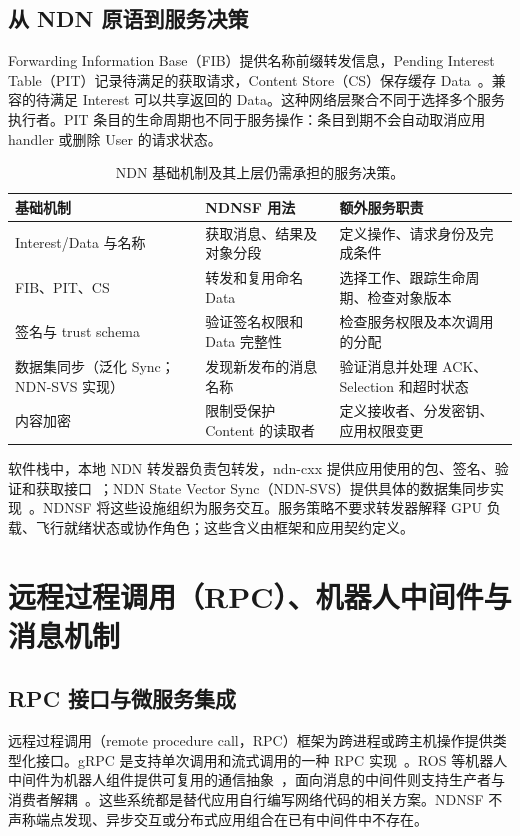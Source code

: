 \subsection{从 NDN 原语到服务决策}
Forwarding Information Base（FIB）提供名称前缀转发信息，Pending Interest Table（PIT）记录待满足的获取请求，Content Store（CS）保存缓存 Data~\cite{yi2013case}。兼容的待满足 Interest 可以共享返回的 Data。这种网络层聚合不同于选择多个服务执行者。PIT 条目的生命周期也不同于服务操作：条目到期不会自动取消应用 handler 或删除 User 的请求状态。

\begin{table}[htbp]\centering\small
\caption{NDN 基础机制及其上层仍需承担的服务决策。}
\label{tab:ndn-runtime-map}
\begin{tabularx}{\textwidth}{p{}XX}
\toprule 基础机制 & NDNSF 用法 & 额外服务职责\\\midrule
Interest/Data 与名称 & 获取消息、结果及对象分段 & 定义操作、请求身份及完成条件\\\midrule
FIB、PIT、CS & 转发和复用命名 Data & 选择工作、跟踪生命周期、检查对象版本\\\midrule
签名与 trust schema & 验证签名权限和 Data 完整性 & 检查服务权限及本次调用的分配\\\midrule
数据集同步（泛化 Sync；NDN-SVS 实现） & 发现新发布的消息名称 & 验证消息并处理 ACK、Selection 和超时状态\\\midrule
内容加密 & 限制受保护 Content 的读取者 & 定义接收者、分发密钥、应用权限变更\\\bottomrule
\end{tabularx}
\end{table}

软件栈中，本地 NDN 转发器负责包转发，ndn-cxx 提供应用使用的包、签名、验证和获取接口~\cite{ndn-cxx}；NDN State Vector Sync（NDN-SVS）提供具体的数据集同步实现~\cite{ndnsvs-github}。NDNSF 将这些设施组织为服务交互。服务策略不要求转发器解释 GPU 负载、飞行就绪状态或协作角色；这些含义由框架和应用契约定义。

\section{远程过程调用（RPC）、机器人中间件与消息机制}
\subsection{RPC 接口与微服务集成}
远程过程调用（remote procedure call，RPC）框架为跨进程或跨主机操作提供类型化接口。gRPC 是支持单次调用和流式调用的一种 RPC 实现~\cite{grpc}。ROS 等机器人中间件为机器人组件提供可复用的通信抽象~\cite{ros,ros2}，面向消息的中间件则支持生产者与消费者解耦~\cite{messagequeue}。这些系统都是替代应用自行编写网络代码的相关方案。NDNSF 不声称端点发现、异步交互或分布式应用组合在已有中间件中不存在。


